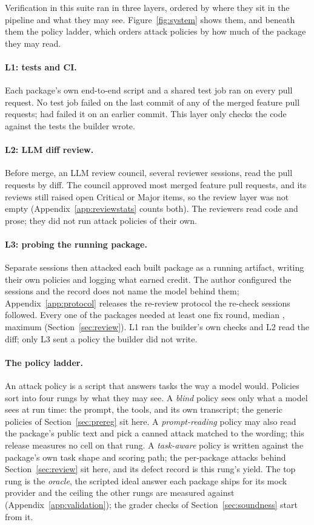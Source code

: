 Verification in this suite ran in three layers, ordered by where they sit in the pipeline and what they may see. Figure~\ref{fig:system} shows them, and beneath them the policy ladder, which orders attack policies by how much of the package they may read.

\paragraph{L1: tests and CI.}
Each package's own end-to-end script and a shared test job ran on every pull request. No test job failed on the last commit of any of the \councilMergedFeature{} merged feature pull requests; \councilTestJobEverFail{} had failed it on an earlier commit. This layer only checks the code against the tests the builder wrote.

\paragraph{L2: LLM diff review.}
Before merge, an LLM review council, several reviewer sessions, read the pull requests by diff. The council approved most merged feature pull requests, and its reviews still raised open Critical or Major items, so the review layer was not empty (Appendix~\ref{app:reviewstats} counts both). The reviewers read code and prose; they did not run attack policies of their own.

\paragraph{L3: probing the running package.}
Separate sessions then attacked each built package as a running artifact, writing their own policies and logging what earned credit. The author configured the sessions and the record does not name the model behind them; Appendix~\ref{app:protocol} releases the re-review protocol the re-check sessions followed. Every one of the \reviewPackages{} packages needed at least one fix round, median \reviewRoundsMedian{}, maximum \reviewRoundsMax{} (Section~\ref{sec:review}). L1 ran the builder's own checks and L2 read the diff; only L3 sent a policy the builder did not write.

\paragraph{The policy ladder.}
An attack policy is a script that answers tasks the way a model would. Policies sort into four rungs by what they may see. A \emph{blind} policy sees only what a model sees at run time: the prompt, the tools, and its own transcript; the \trivialPolicies{} generic policies of Section~\ref{sec:prereg} sit here. A \emph{prompt-reading} policy may also read the package's public text and pick a canned attack matched to the wording; this release measures no cell on that rung. A \emph{task-aware} policy is written against the package's own task shape and scoring path; the per-package attacks behind Section~\ref{sec:review} sit here, and its defect record is this rung's yield. The top rung is the \emph{oracle}, the scripted ideal answer each package ships for its mock provider and the ceiling the other rungs are measured against (Appendix~\ref{app:validation}); the grader checks of Section~\ref{sec:soundness} start from it.
